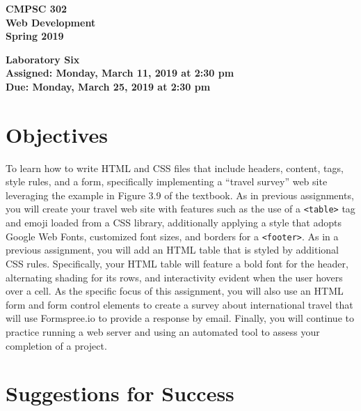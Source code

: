 \documentclass[11pt]{article}
\newcommand{\assignmentduedate}{March 25}
\newcommand{\assignmentassignedate}{March 11}
\newcommand{\assignmentnumber}{Six}
\newcommand{\labyear}{2019}
\newcommand{\labday}{Monday}
\newcommand{\labtime}{2:30 pm}
\newcommand{\assigneddate}{Assigned: \labday, \assignmentassignedate, \labyear{} at \labtime{}}
\newcommand{\duedate}{Due: \labday, \assignmentduedate, \labyear{} at \labtime{}}
\newcommand{\program}[1]{\lstinline{#1}}
\newcommand{\labtitle}[1]
{
  \begin{center}
    \begin{center}
      \bf
      CMPSC 302\\Web Development\\
      Spring 2019\\
      \medskip
    \end{center}
    \bf
    #1
  \end{center}
}
\begin{document}
\thispagestyle{empty}

\labtitle{Laboratory \assignmentnumber{} \\ \assigneddate{} \\ \duedate{}}

\section*{Objectives}

To learn how to write HTML and CSS files that include headers, content, tags,
style rules, and a form, specifically implementing a ``travel survey'' web site
leveraging the example in Figure 3.9 of the textbook. As in previous
assignments, you will create your travel web site with features such as the use
of a \program{<table>} tag and emoji loaded from a CSS library, additionally
applying a style that adopts Google Web Fonts, customized font sizes, and
borders for a \program{<footer>}. As in a previous assignment, you will add an
HTML table that is styled by additional CSS rules. Specifically, your HTML table
will feature a bold font for the header, alternating shading for its rows, and
interactivity evident when the user hovers over a cell. As the specific focus of
this assignment, you will also use an HTML form and form control elements to
create a survey about international travel that will use Formspree.io to provide
a response by email. Finally, you will continue to practice running a web server
and using an automated tool to assess your completion of a project.

\section*{Suggestions for Success}
\end{document}
